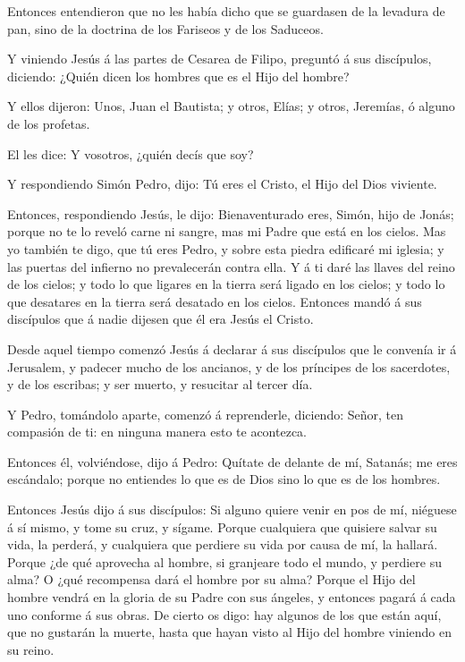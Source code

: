 Entonces entendieron que no les había dicho que se
guardasen de la levadura de pan, sino de la doctrina de los Fariseos y
de los Saduceos.

 Y viniendo Jesús á las partes de Cesarea de Filipo,
preguntó á sus discípulos, diciendo: ¿Quién dicen los hombres que es el
Hijo del hombre?

 Y ellos dijeron: Unos, Juan el Bautista; y otros, Elías; y
otros, Jeremías, ó alguno de los profetas.

 El les dice: Y vosotros, ¿quién decís que soy?

 Y respondiendo Simón Pedro, dijo: Tú eres el Cristo, el
Hijo del Dios viviente.

 Entonces, respondiendo Jesús, le dijo: Bienaventurado
eres, Simón, hijo de Jonás; porque no te lo reveló carne ni sangre, mas
mi Padre que está en los cielos.  Mas yo también te digo,
que tú eres Pedro, y sobre esta piedra edificaré mi iglesia; y las
puertas del infierno no prevalecerán contra ella.  Y á ti
daré las llaves del reino de los cielos; y todo lo que ligares en la
tierra será ligado en los cielos; y todo lo que desatares en la tierra
será desatado en los cielos.  Entonces mandó á sus
discípulos que á nadie dijesen que él era Jesús el Cristo.

 Desde aquel tiempo comenzó Jesús á declarar á sus
discípulos que le convenía ir á Jerusalem, y padecer mucho de los
ancianos, y de los príncipes de los sacerdotes, y de los escribas; y ser
muerto, y resucitar al tercer día.

 Y Pedro, tomándolo aparte, comenzó á reprenderle,
diciendo: Señor, ten compasión de ti: en ninguna manera esto te
acontezca.

 Entonces él, volviéndose, dijo á Pedro: Quítate de delante
de mí, Satanás; me eres escándalo; porque no entiendes lo que es de Dios
sino lo que es de los hombres.

 Entonces Jesús dijo á sus discípulos: Si alguno quiere
venir en pos de mí, niéguese á sí mismo, y tome su cruz, y sígame.
 Porque cualquiera que quisiere salvar su vida, la perderá,
y cualquiera que perdiere su vida por causa de mí, la hallará.
 Porque ¿de qué aprovecha al hombre, si granjeare todo el
mundo, y perdiere su alma? O ¿qué recompensa dará el hombre por su alma?
 Porque el Hijo del hombre vendrá en la gloria de su Padre
con sus ángeles, y entonces pagará á cada uno conforme á sus obras.
 De cierto os digo: hay algunos de los que están aquí, que
no gustarán la muerte, hasta que hayan visto al Hijo del hombre viniendo
en su reino.

